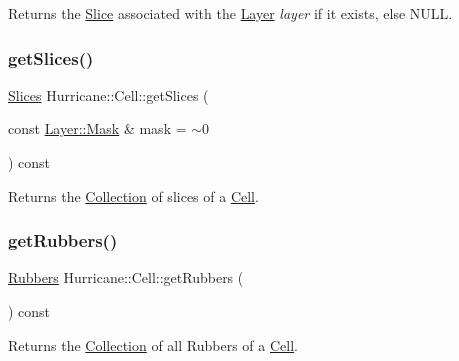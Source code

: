 Returns the \mbox{\hyperlink{classHurricane_1_1Slice}{Slice}} associated with the \mbox{\hyperlink{classHurricane_1_1Layer}{Layer}} {\itshape layer} if it exists, else {\ttfamily N\+U\+LL}. \mbox{\label{classHurricane_1_1Cell_aba933a81e3cacfc05b7bd1660e2a933a}} 
\subsubsection{\texorpdfstring{get\+Slices()}{getSlices()}}
{\footnotesize\ttfamily \mbox{\hyperlink{namespaceHurricane_aa4a7e8a563c5687621eb5e57ade1706a}{Slices}} Hurricane\+::\+Cell\+::get\+Slices (\begin{DoxyParamCaption}\item[{const \mbox{\hyperlink{classHurricane_1_1Layer_af5277c670637bd5d910237e7afe01a91}{Layer\+::\+Mask}} \&}]{mask = {\ttfamily $\sim$0} }\end{DoxyParamCaption}) const}

Returns the \mbox{\hyperlink{classHurricane_1_1Collection}{Collection}} of slices of a \mbox{\hyperlink{classHurricane_1_1Cell}{Cell}}. \mbox{\label{classHurricane_1_1Cell_a56395a189898d5ae2a869d5a5d5dfdbe}} 
\subsubsection{\texorpdfstring{get\+Rubbers()}{getRubbers()}}
{\footnotesize\ttfamily \mbox{\hyperlink{namespaceHurricane_af8923abd57508cc44931a00d61b564ad}{Rubbers}} Hurricane\+::\+Cell\+::get\+Rubbers (\begin{DoxyParamCaption}{ }\end{DoxyParamCaption}) const}

Returns the \mbox{\hyperlink{classHurricane_1_1Collection}{Collection}} of all Rubbers of a \mbox{\hyperlink{classHurricane_1_1Cell}{Cell}}. \mbox{\label{classHurricane_1_1Cell_a58c6e24401d15f375547ad95b5c2c27c}} 
